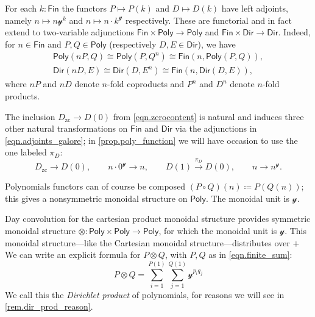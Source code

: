 \documentclass[11pt, article, one side]{memoir}
\theoremstyle{theorem}
\theoremstyle{definition}
\theoremstyle{remark}
\newcommand{\Cat}[1]{\mathsf{#1}}%
\newcommand{\To}[1]{\xrightarrow{#1}}
\newcommand{\fin}{\Cat{Fin}}
\newcommand{\zero}[1]{#1_\text{zc}}
\newcommand{\yon}{\mathcal{y}}
\newcommand{\poly}{\Cat{Poly}}
\newcommand{\dir}{\Cat{Dir}}
\newcommand{\mdot}{{\cdot}}
\begin{document}
For each $k:\fin$ the functors $P\mapsto P(k)$ and $D\mapsto D(k)$ have left adjoints, namely $n\mapsto n\yon^k$ and $n\mapsto n\mdot k^\yon$ respectively. These are functorial and in fact extend to two-variable adjunctions $\fin\times\poly\to\poly$ and $\fin\times\dir\to\dir$. Indeed, for $n\in\fin$ and $P,Q\in\poly$ (respectively $D,E\in\dir$), we have
\begin{gather*}
\poly(nP,Q)\cong\poly(P,Q^n)\cong\fin(n,\poly(P,Q)),\\
\dir(nD,E)\cong\dir(D,E^n)\cong\fin(n,\dir(D,E)),
\end{gather*}
where $nP$ and $nD$ denote $n$-fold coproducts and $P^n$ and $D^n$ denote $n$-fold products.


The inclusion $\zero{D}\to D(0)$ from \cref{eqn.zerocontent} is natural and induces three other natural transformations on $\fin$ and $\dir$ via the adjunctions in \cref{eqn.adjoints_galore}; in \cref{prop.poly_function} we will have occasion to use the one labeled $\pi_D$:
\begin{equation}\label{eqn.obtain_pi}
\zero{D}\to D(0),\qquad
n\mdot0^\yon\to n,\qquad
D(1)\To{\pi_D} D(0),\qquad
n\to n^\yon.
\end{equation}

Polynomials functors can of course be composed $(P\circ Q)(n)\coloneqq P(Q(n))$; this gives a nonsymmetric monoidal structure on $\poly$. The monoidal unit is $\yon$.

Day convolution for the cartesian product monoidal structure provides symmetric monoidal structure $\otimes\colon\poly\times\poly\to\poly$, for which the monoidal unit is $\yon$. This monoidal structure---like the Cartesian monoidal structure---distributes over $+$ We can write an explicit formula for $P\otimes Q$, with $P,Q$ as in \cref{eqn.finite_sum}:
\begin{equation}\label{eqn.dir_monoidal_product}
  P\otimes
  Q=
  \sum_{i=1}^{P(1)}\sum_{j=1}^{Q(1)}\yon^{p_iq_j}
\end{equation}
We call this the \emph{Dirichlet product} of polynomials, for reasons we will see in \cref{rem.dir_prod_reason}.
\end{document}
